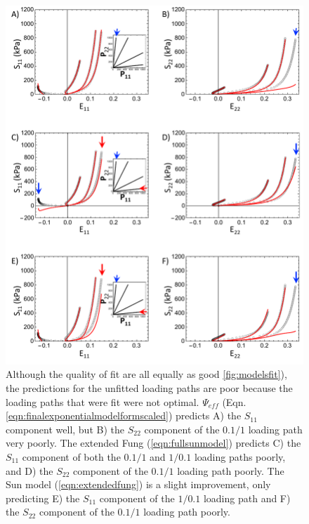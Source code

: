 \begin{figure}[!hbtp]
\centering
\includegraphics[width=6.5in]{Figures/modelspred}
\caption{Although the quality of fit are all equally as good \ref{fig:modelsfit}), the predictions for the unfitted loading paths are poor because the loading paths that were fit were not optimal. $\Psi_{eff}$ (Eqn. \ref{eqn:finalexponentialmodelformscaled}) predicts A) the $S_{11}$ component well, but B) the $S_{22}$ component of the $0.1/1$ loading path very poorly. The extended Fung (\ref{eqn:fullsunmodel}) predicts C) the $S_{11}$ component of both the $0.1/1$ and $1/0.1$ loading paths poorly, and D) the $S_{22}$ component of the $0.1/1$ loading path poorly. The Sun model (\ref{eqn:extendedfung}) is a slight improvement, only predicting E) the $S_{11}$ component of the $1/0.1$ loading path and F) the $S_{22}$ component of the $0.1/1$ loading path poorly. }
\label{fig:modelspred}
\end{figure} 




